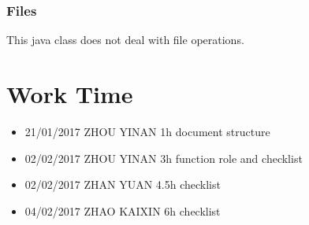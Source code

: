 \documentclass{article}
\begin{document}
 \subsubsection{Files}
 This java class does not deal with file operations. 
 
 \section{Work Time}
 \begin{itemize}
 	\item 21/01/2017 ZHOU YINAN 1h document structure
 	\item 02/02/2017 ZHOU YINAN 3h function role and checklist
 	\item 02/02/2017 ZHAN YUAN	4.5h checklist
 	\item 04/02/2017 ZHAO KAIXIN 6h checklist
 \end{itemize}
\end{document}
